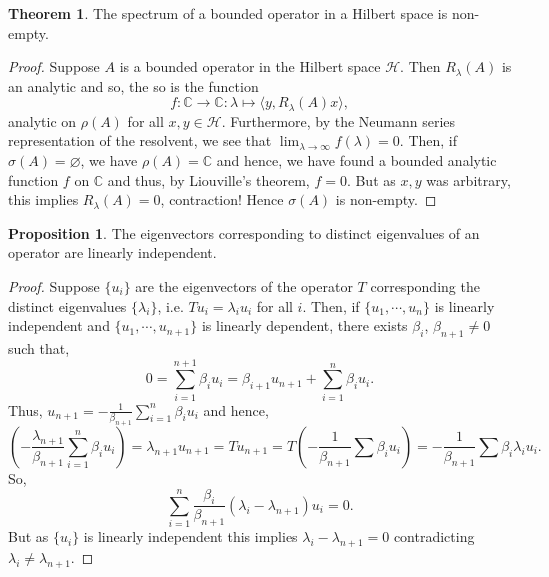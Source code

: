 \documentclass[]{article}
\theoremstyle{definition}
\newtheorem{theorem}{Theorem}
\theoremstyle{definition}
\newtheorem{proposition}{Proposition}[section]
\begin{document}
\begin{theorem}
  The spectrum of a bounded operator in a Hilbert space is non-empty.
\end{theorem}
\begin{proof}
  Suppose \(A\) is a bounded operator in the Hilbert space \(\mathcal{H}\). 
  Then \(R_\lambda(A)\) is an analytic and so, the so is the function 
  \[f : \mathbb{C} \to \mathbb{C} : \lambda \mapsto \langle y, R_\lambda(A)x\rangle,\]
  analytic on \(\rho(A)\) for all \(x, y \in \mathcal{H}\). Furthermore, by 
  the Neumann series representation of the resolvent, we see that 
  \(\lim_{\lambda \to \infty} f(\lambda) = 0\). Then, if 
  \(\sigma(A) = \varnothing\), 
  we have \(\rho(A) = \mathbb{C}\) and hence, we have found a bounded analytic 
  function \(f\) on \(\mathbb{C}\) and thus, by Liouville's theorem, 
  \(f = 0\). But as \(x, y\) was arbitrary, this implies \(R_\lambda(A) = 0\), 
  contraction! Hence \(\sigma(A)\) is non-empty.
\end{proof}

\begin{proposition}
  The eigenvectors corresponding to distinct eigenvalues of an operator are 
  linearly independent.
\end{proposition}
\begin{proof}
  Suppose \(\{u_i\}\) are the eigenvectors of the operator \(T\) corresponding 
  the distinct eigenvalues \(\{\lambda_i\}\), i.e. \(Tu_i = \lambda_i u_i\) 
  for all \(i\). Then, if \(\{u_1, \cdots, u_n\}\) is linearly independent and 
  \(\{u_1, \cdots, u_{n + 1}\}\) is linearly dependent, there exists 
  \(\beta_i\), \(\beta_{n + 1} \neq 0\) such that, 
  \[0 = \sum_{i = 1}^{n + 1}\beta_i u_i = \beta_{i + 1}u_{n + 1} + 
    \sum_{i = 1}^n \beta_i u_i.\]
  Thus, \(u_{n + 1} = -\frac{1}{\beta_{n + 1}} \sum_{i = 1}^n \beta_i u_i\) and 
  hence, 
  \[\left(-\frac{\lambda_{n + 1}}{\beta_{n + 1}} \sum_{i = 1}^n \beta_i u_i\right)=
  \lambda_{n + 1}u_{n + 1} = Tu_{n + 1} = T 
  \left(-\frac{1}{\beta_{n + 1}} \sum \beta_i u_i\right) = 
  -\frac{1}{\beta_{n + 1}}\sum \beta_i \lambda_i u_i.\]
  So, 
  \[\sum_{i = 1}^n \frac{\beta_i}{\beta_{n + 1}}(\lambda_i - \lambda_{n + 1})u_i = 0.\]
  But as \(\{u_i\}\) is linearly independent this implies \(\lambda_i - \lambda_{n + 1} = 0\) 
  contradicting \(\lambda_i \neq \lambda_{n + 1}\).
\end{proof}
\end{document}
